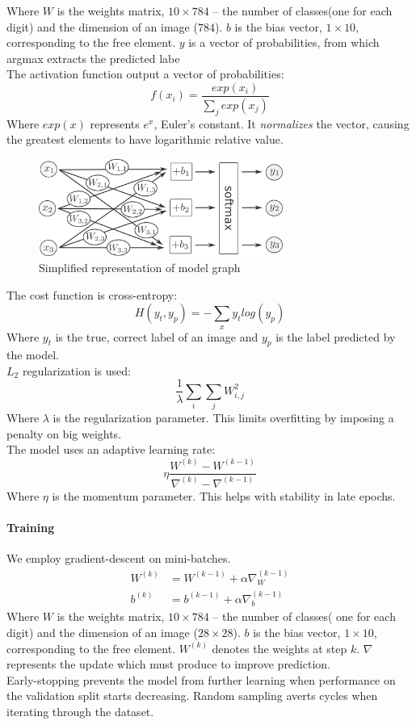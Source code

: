 \documentclass[a4paper]{article}
\begin{document}
Where $W$ is the weights matrix, $10 \times 784$ -- the number of classes(one for each digit) and the dimension of an image ($784$). $b$ is the bias vector, $1 \times 10$, corresponding to the free element. $y$ is a vector of probabilities, from which argmax extracts the predicted labe
\\

The activation function output a vector of probabilities:
$$f(x_i)=\frac{exp(x_i)}{\sum_j exp(x_j)}$$
Where $exp(x)$ represents $e^x$, Euler's constant. It \textit{normalizes} the vector, causing the greatest elements to have logarithmic relative value.
\\

\begin{figure}[htb]
\centering
\includegraphics[width=8cm]{images/model-graph.png}
\caption{Simplified representation of model graph \cite{tf}}
\end{figure}

The cost function is cross-entropy:
$$H(y_t, y_p)=-\sum_x y_t log(y_p)$$
Where $y_t$ is the true, correct label of an image and $y_p$ is the label predicted by the model.
\\

$L_2$ regularization is used:
$$\frac{1}{\lambda} \sum_i \sum_j W_{i,j}^2$$
Where $\lambda$ is the regularization parameter. This limits overfitting by imposing a penalty on big weights.
\\

The model uses an adaptive learning rate:
$$\eta \frac{ W^{(k)} - W^{(k-1)} } { \nabla^{(k)} - \nabla^{(k-1)} }$$
Where $\eta$ is the momentum parameter. This helps with stability in late epochs.

\paragraph{Training} We employ gradient-descent on mini-batches. 
\begin{align*}
W^{(k)} &= W^{(k-1)} + \alpha \nabla_W^{(k-1)} \\ 
b^{(k)} &= b^{(k-1)} + \alpha \nabla_b^{(k-1)}
\end{align*}
Where $W$ is the weights matrix, $10 \times 784$ -- the number of classes( one for each digit) and the dimension of an image ($28 \times 28$). $b$ is the bias vector, $1 \times 10$, corresponding to the free element. $W^{(k)}$ denotes the weights at step $k$. $\nabla$ represents the update which must produce to improve prediction.
\\
Early-stopping prevents the model from further learning when performance on the validation split starts decreasing. Random sampling averts cycles when iterating through the dataset.
\end{document}
